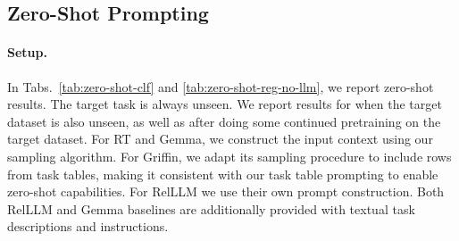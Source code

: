 \subsection{Zero-Shot Prompting}
\label{sec:zero_shot}

\paragraph{Setup.}
In Tabs.~\ref{tab:zero-shot-clf} and \ref{tab:zero-shot-reg-no-llm},
we report zero-shot results.
The target task is always unseen.
We report results for when the target dataset is also unseen,
as well as after doing some continued pretraining on the target dataset.
For RT and Gemma, we construct the input context using our sampling algorithm.
For Griffin, we adapt its sampling procedure to include rows from task tables, making it consistent with our task table prompting to enable zero-shot capabilities.
For RelLLM we use their own prompt construction. 
Both RelLLM and Gemma baselines are additionally provided with textual task descriptions and instructions.


